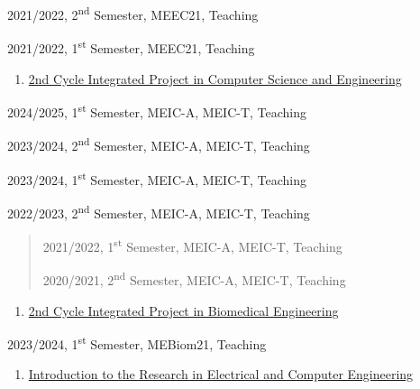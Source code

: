 \documentclass[
]{article}
\begin{document}
2021/2022, 2\textsuperscript{nd} Semester, MEEC21, Teaching

2021/2022, 1\textsuperscript{st} Semester, MEEC21, Teaching

\begin{enumerate}
\def\labelenumi{\arabic{enumi}.}
\setcounter{enumi}{22}
\item
  \ul{2nd Cycle Integrated Project in Computer Science and Engineering}
\end{enumerate}

2024/2025, 1\textsuperscript{st} Semester, MEIC-A, MEIC-T, Teaching

2023/2024, 2\textsuperscript{nd} Semester, MEIC-A, MEIC-T, Teaching

2023/2024, 1\textsuperscript{st} Semester, MEIC-A, MEIC-T, Teaching

2022/2023, 2\textsuperscript{nd} Semester, MEIC-A, MEIC-T, Teaching

\begin{quote}
2021/2022, 1\textsuperscript{st} Semester, MEIC-A, MEIC-T, Teaching

2020/2021, 2\textsuperscript{nd} Semester, MEIC-A, MEIC-T, Teaching
\end{quote}

\begin{enumerate}
\def\labelenumi{\arabic{enumi}.}
\setcounter{enumi}{23}
\item
  \ul{2nd Cycle Integrated Project in Biomedical Engineering}
\end{enumerate}

2023/2024, 1\textsuperscript{st} Semester, MEBiom21, Teaching

\begin{enumerate}
\def\labelenumi{\arabic{enumi}.}
\setcounter{enumi}{24}
\item
  \ul{Introduction to the Research in Electrical and Computer
  Engineering}
\end{enumerate}
\end{document}
